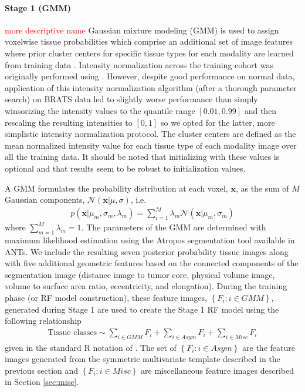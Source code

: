 \documentclass[preprint,authoryear,review,12pt]{elsarticle}
\begin{document}
\paragraph{Stage 1 (GMM)} \textcolor{red}{more descriptive name}
Gaussian mixture modeling (GMM) is used to assign voxelwise
tissue probabilities which comprise an additional set of image features 
where 
prior cluster centers for specific tissue types for each
modality are learned from training data \citep{reynolds2009}.  
Intensity normalization
across the training cohort was originally performed using 
\cite{nyul2000}.  However, despite good performance on normal
data, application of this intensity normalization algorithm 
(after a thorough parameter search) on BRATS data led to slightly 
worse performance than simply winsorizing the intensity values to the quantile
range $[0.01, 0.99]$ and then rescaling the resulting intensities to 
$[0,1]$ so we opted for the latter, more simplistic intensity
normalization protocol.  The cluster centers are defined as the mean
normalized intensity value for each tissue type of each modality 
image over all the training data.  It should be noted that 
initializing with these values is optional and that results
seem to be robust to initialization values.

A GMM formulates the 
probability distribution at each voxel, $\mathbf{x}$, as the
sum of $M$ Gaussian components, $\mathcal{N}(\mathbf{x}|\mu,\sigma)$, i.e.
\begin{align}
p\left(\mathbf{x}|\mu_m,\sigma_m,\lambda_m\right) = \sum_{i=1}^M \lambda_m \mathcal{N}(\mathbf{x}|\mu_m,\sigma_m)
\end{align}
where $\sum_{m=1}^M \lambda_m = 1$.  The parameters of the GMM 
are determined with maximum likelihood estimation using the 
Atropos segmentation tool \citep{avants2011} available in ANTs.  
We include the resulting seven posterior probability tissue images 
along with five additional geometric features based on the connected 
components of the segmentation image (distance image to tumor core,
physical volume image, volume to surface area ratio, eccentricity,
and elongation).
During the training phase (or RF model construction),
these feature images, $\left\{F_i: i \in GMM\right\}$, generated during Stage 1 are used to create
the Stage 1 RF model using the following relationship
\begin{align}
\label{eq:gmm}
\mathrm{Tissue}\,\,\mathrm{classes} \sim \sum_{i \in GMM} F_i + \sum_{i \in Asym} F_i + \sum_{i \in Misc} F_i
\end{align}
given in the standard R notation of \cite{wilkinson1973}.  The
set of $\left\{F_i: i \in Asym\right\}$ are the feature images 
generated from the symmetric multivariate template 
described in the previous section and $\left\{F_i: i \in Misc\right\}$
are miscellaneous  feature images described in Section \ref{sec:misc}.
\end{document}
